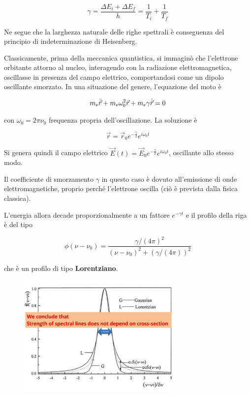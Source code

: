 \begin{equation*}
  \gamma=\frac{\Delta E_i + \Delta E_f}{h}=\frac{1}{T_i} + \frac{1}{T_f}
\end{equation*}

Ne segue che la larghezza naturale delle righe spettrali è conseguenza del principio di indeterminazione di Heisenberg.

\vspace{0.2cm}Classicamente, prima della meccanica quantistica, si immaginò che l'elettrone orbitante attorno al nucleo, interagendo con la radiazione elettromagnetica, oscillasse in presenza del campo elettrico, comportandosi come un dipolo oscillante smorzato. In una situazione del genere, l'equazione del moto è

\begin{equation*}
  m_e \Ddot{\vec{r}} + m_e \omega_0^2 \vec{r} + m_e \gamma \dot{\vec{r}}=0
\end{equation*}

con $\omega_0=2 \pi \nu_0$ frequenza propria dell'oscillazione. La soluzione è

\begin{equation*}
  \vec{r}=\vec{r}_0 e^{-\frac{\gamma}{2}} e^{i \omega_0 t}
\end{equation*}

Si genera quindi il campo elettrico $\vec{E}(t)=\vec{E}_0 e^{-\frac{\gamma}{2}} e^{i \omega_0 t}$, oscillante allo stesso modo.

Il coefficiente di smorzamento $\gamma$ in questo caso è dovuto all'emissione di onde elettromagnetiche, proprio perché l'elettrone oscilla (ciò è prevista dalla fisica classica).

L'energia allora decade proporzionalmente a un fattore $e^{-\gamma t}$ e il profilo della riga è del tipo

\begin{equation}
  \phi(\nu - \nu_0)=\frac{\gamma/(4\pi)^2}{(\nu-\nu_0)^2 + (\gamma/(4\pi))^2}
\end{equation}

che è un profilo di tipo \textbf{Lorentziano}.

\begin{figure}[H]
  \centering
  \includegraphics[width=8cm]{cross_section.jpg}
  \label{fig:cross section }
\end{figure}

